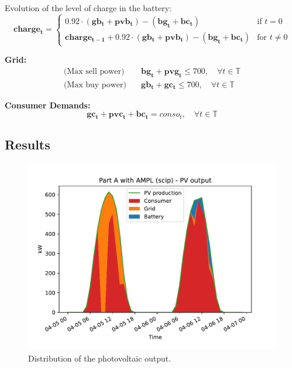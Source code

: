 \documentclass[12pt]{article}
\newcommand{\VAR}[1]{\mathbf{#1}}
\newcommand{\T}{\mathbb{T}}
\begin{document}
Evolution of the level of charge in the battery:
\begin{equation}
    \VAR{charge_t} =
    \begin{cases}
        0.92 \cdot (\VAR{gb_t} + \VAR{pvb_t}) - (\VAR{bg_t} + \VAR{bc_t}) & \text{if } t = 0 \\
        \VAR{charge_{t-1}} + 0.92 \cdot (\VAR{gb_t} + \VAR{pvb_t}) - (\VAR{bg_t} + \VAR{bc_t}) & \text{for } t \neq 0
    \end{cases}
\end{equation}

\textbf{Grid:}
\begin{align}
\text{(Max sell power)} & \quad \VAR{bg_t} + \VAR{pvg_t} \leq 700, \quad \forall t \in \T \\
\text{(Max buy power)} & \quad \VAR{gb_t} + \VAR{gc_t} \leq 700, \quad \forall t \in \T
\end{align}

\textbf{Consumer Demands:}
\begin{equation}
    \VAR{gc_t} + \VAR{pvc_t} + \VAR{bc_t} = conso_t, \quad \forall t \in \T
\end{equation}

\subsection{Results}
\begin{figure}[p]
    \centering
    \includegraphics[width=\textwidth]{figs/PartA/pv_output}
    \caption{Distribution of the photovoltaic output.}
\end{figure}
\end{document}
